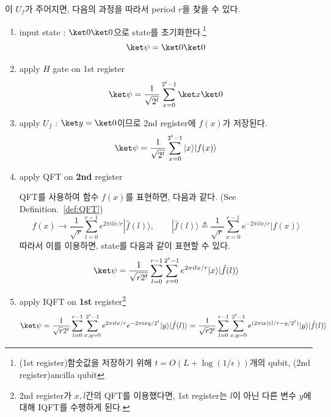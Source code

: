 \newpage
이 $U_f$가 주어지면, 다음의 과정을 따라서 period $r$을 찾을 수 있다.
\begin{enumerate}
  \item input state : $\ket 0 \ket 0$으로 state를 초기화한다.\footnote{(1st register)함숫값을 저장하기 위해 $t = O(L + \log(1/\epsilon))$개의 qubit, (2nd register)ancilla qubit}
  \begin{equation*}
    \ket \psi = \ket 0 \ket 0
  \end{equation*}
  \item apply $H$ gate on 1st register
  \begin{equation*}
    \ket \psi = \frac{1}{\sqrt{2^t}} \sum_{x=0}^{2^t-1}\ket x \ket 0
  \end{equation*}
  \item apply $U_f$ : $\ket y = \ket 0$이므로 2nd register에 $f(x)$가 저장된다. 
  \begin{equation*}
    \ket \psi = \frac{1}{\sqrt{2^t}} \sum_{x=0}^{2^t-1}|x\rangle|f(x)\rangle 
  \end{equation*}
  \item apply QFT on \textbf{2nd} register
  
  QFT를 사용하여 함수 $f(x)$를 표현하면, 다음과 같다. (See Definition.~\ref{def:QFT})
  \begin{equation*}
    f(x) \rightarrow  \frac{1}{\sqrt{r}} \sum_{l=0}^{r-1} e^{2 \pi i l x / r}|\hat f(l)\rangle,\qquad  |\hat{f}(l)\rangle \triangleq \frac{1}{\sqrt{r}} \sum_{x=0}^{r-1} e^{-2 \pi i l x / r}|f(x)\rangle
  \end{equation*}
  따라서 이를 이용하면, state를 다음과 같이 표현할 수 있다. 
  \begin{equation*}
    \ket \psi = \frac{1}{\sqrt{r 2^t}} \sum_{l=0}^{r-1} \sum_{x=0}^{2^t-1} e^{2 \pi i l x / r}|x\rangle|\hat{f}(l)\rangle
  \end{equation*}
  \item apply IQFT on \textbf{1st} register\footnote{2nd register가 $x, l$간의 QFT를 이용했다면, 1st register는 $l$이 아닌 다른 변수 $y$에 대해 IQFT를 수행하게 된다.}
  \begin{equation}
      \ket \psi = \frac{1}{\sqrt{r} 2^t} \sum_{l=0}^{r-1} \sum_{x, y=0}^{2^t-1} e^{2 \pi i l x / r} e^{-2 \pi i x y / 2^t}|y\rangle|\hat{f}(l)\rangle =\frac{1}{\sqrt{r} 2^t} \sum_{l=0}^{r-1} \sum_{x, y=0}^{2^t-1} e^{(2 \pi i x)(l/r - y/2^t)}|y\rangle|\hat{f}(l)\rangle \label{eq:period-final}
  \end{equation}
\end{enumerate}

